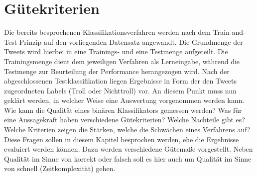 \section{Gütekriterien}\raggedbottom
Die bereits besprochenen Klassifikationsverfahren werden nach dem \glqq Train-and-Test\grqq-Prinzip auf den vorliegenden Datensatz angewandt. Die Grundmenge der Tweets wird hierbei in eine Trainings- und eine Testmenge aufgeteilt. Die Trainingsmenge dient dem jeweiligen Verfahren als Lerneingabe, während die Testmenge zur Beurteilung der Performance herangezogen wird. Nach der abgeschlossenen Testklassifikation liegen Ergebnisse in Form der den Tweets zugeordneten Labels (Troll oder Nichttroll) vor. An diesem Punkt muss nun geklärt werden, in welcher Weise eine Auswertung vorgenommen werden kann. Wie kann die Qualität eines binären Klassifikators gemessen werden? Was für eine Aussagekraft haben verschiedene Gütekriterien? Welche Nachteile gibt es? Welche Kriterien zeigen die Stärken, welche die Schwächen eines Verfahrens auf? Diese Fragen sollen in diesem Kapitel besprochen werden, ehe die Ergebnisse evaluiert werden können. Dazu werden verschiedene Gütemaße \citep{perfmetrics2015} vorgestellt. Neben Qualität im Sinne von korrekt oder falsch soll es hier auch um Qualität im Sinne von schnell (Zeitkomplexität) gehen. 
